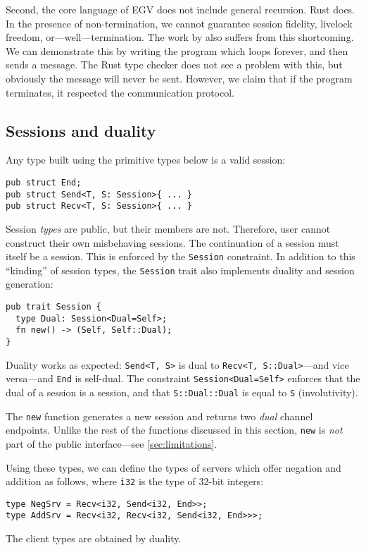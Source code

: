 \documentclass[sigconf,natbib=false]{acmart}
\begin{document}
Second, the core language of EGV does not include general recursion. Rust does. In the presence of non-termination, we cannot guarantee session fidelity, livelock freedom, or---well---termination. The work by \textcite{jespersen2015} also suffers from this shortcoming. We can demonstrate this by writing the program which loops forever, and then sends a message. The Rust type checker does not see a problem with this, but obviously the message will never be sent. However, we claim that if the program terminates, it respected the communication protocol.

\subsection*{Sessions and duality}
Any type built using the primitive types below is a valid session:
\begin{lstlisting}
pub struct End;
pub struct Send<T, S: Session>{ ... }
pub struct Recv<T, S: Session>{ ... }
\end{lstlisting}
Session \emph{types} are public, but their members are not. Therefore, user cannot construct their own misbehaving sessions. The continuation of a session must itself be a session. This is enforced by the \lstinline{Session} constraint. In addition to this ``kinding'' of session types, the \lstinline{Session} trait also implements duality and session generation:
\begin{lstlisting}
pub trait Session {
  type Dual: Session<Dual=Self>;
  fn new() -> (Self, Self::Dual);
}
\end{lstlisting}
Duality works as expected: \lstinline{Send<T, S>} is dual to \lstinline{Recv<T, S::Dual>}---and vice versa---and \lstinline{End} is self-dual.
The constraint \lstinline{Session<Dual=Self>} enforces that the dual of a
session is a session, and that \lstinline{S::Dual::Dual} is equal to \lstinline{S} (involutivity).

The \lstinline{new} function generates a new session and returns two \emph{dual} channel endpoints. Unlike the rest of the functions discussed in this section, \lstinline{new} is \emph{not} part of the public interface---see \cref{sec:limitations}.

Using these types, we can define the types of servers which offer negation and addition as follows, where \lstinline{i32} is the type of 32-bit integers:
\begin{lstlisting}
type NegSrv = Recv<i32, Send<i32, End>>;
type AddSrv = Recv<i32, Recv<i32, Send<i32, End>>>;
\end{lstlisting}
The client types are obtained by duality.
\end{document}
